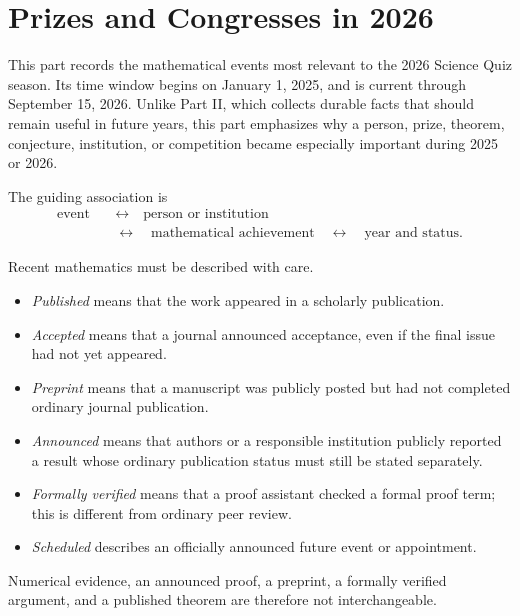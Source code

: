    \chapter{Prizes and Congresses in 2026}

    This part records the mathematical events most relevant to the 2026
    Science Quiz season. Its time window begins on January 1, 2025, and is
    current through September 15, 2026. Unlike Part II, which collects durable facts
    that should remain useful in future years, this part emphasizes why a
    person, prize, theorem, conjecture, institution, or competition became
    especially important during 2025 or 2026.

    The guiding association is
    \[
        \begin{aligned}
            \text{event}
            &\quad\longleftrightarrow\quad
            \text{person or institution}\\
            &\quad\longleftrightarrow\quad
            \text{mathematical achievement}
            \quad\longleftrightarrow\quad
            \text{year and status}.
        \end{aligned}
    \]

    \begin{fact}
        Recent mathematics must be described with care.
        \begin{itemize}
            \item \emph{Published} means that the work appeared in a scholarly
                  publication.
            \item \emph{Accepted} means that a journal announced acceptance, even
                  if the final issue had not yet appeared.
            \item \emph{Preprint} means that a manuscript was publicly posted but
                  had not completed ordinary journal publication.
            \item \emph{Announced} means that authors or a responsible institution
                  publicly reported a result whose ordinary publication status must
                  still be stated separately.
            \item \emph{Formally verified} means that a proof assistant checked a
                  formal proof term; this is different from ordinary peer review.
            \item \emph{Scheduled} describes an officially announced future event
                  or appointment.
        \end{itemize}
        Numerical evidence, an announced proof, a preprint, a formally verified
        argument, and a published theorem are therefore not interchangeable.
    \end{fact}


